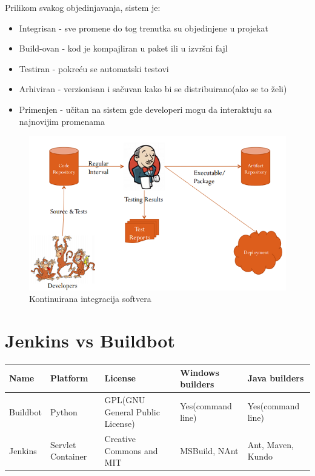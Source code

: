 \documentclass[a4paper]{article}
\begin{document}
{Prilikom svakog objedinjavanja, sistem je:
\begin{itemize}
\item Integrisan - sve promene do tog trenutka su objedinjene u projekat
\item Build-ovan - kod je kompajliran u paket ili u izvršni fajl
\item Testiran - pokreću se automatski testovi
\item Arhiviran - verzionisan i sačuvan kako bi se distribuirano(ako se to želi)
\item Primenjen - učitan na sistem gde developeri mogu da interaktuju sa najnovijim promenama
\end{itemize} 

\begin{figure}[ht]
\begin{center}
\includegraphics[scale=0.75, totalheight=0.35\textheight]{slike/workflow.png}
\end{center}
\caption{Kontinuirana integracija softvera}
\label{fig:Kontinuirana integracija softvera}
\end{figure}







\section{Jenkins vs Buildbot}
\begin{center}
\begin{tabular}{|p{2cm}|p{2cm}|p{2cm}|p{2cm}|p{2cm}|}
\hline
Name & Platform & License & Windows builders & Java builders \\ \hline
Buildbot & Python & GPL(GNU General Public License) & Yes(command line) & Yes(command line) \\ \hline
Jenkins & Servlet Container & Creative Commons and MIT & MSBuild, NAnt & Ant, Maven, Kundo \\ \hline
\end{tabular}
\end{center} 

}
\end{document}
